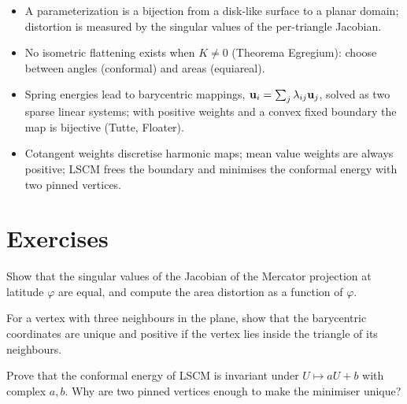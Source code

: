 \begin{keypoints}
\begin{itemize}[leftmargin=*]
  \item A parameterization is a bijection from a disk-like surface to a planar domain; distortion is
  measured by the singular values of the per-triangle Jacobian.
  \item No isometric flattening exists when $K\neq0$ (Theorema Egregium): choose between angles
  (conformal) and areas (equiareal).
  \item Spring energies lead to barycentric mappings, $\mathbf{u}_i=\sum_j\lambda_{ij}\mathbf{u}_j$, solved as two
  sparse linear systems; with positive weights and a convex fixed boundary the map is bijective
  (Tutte, Floater).
  \item Cotangent weights discretise harmonic maps; mean value weights are always positive; LSCM
  frees the boundary and minimises the conformal energy with two pinned vertices.
\end{itemize}
\end{keypoints}

\section*{Exercises}
\begin{exercise}
Show that the singular values of the Jacobian of the Mercator projection at latitude $\varphi$ are
equal, and compute the area distortion as a function of $\varphi$.
\end{exercise}
\begin{exercise}
For a vertex with three neighbours in the plane, show that the barycentric coordinates are unique
and positive if the vertex lies inside the triangle of its neighbours.
\end{exercise}
\begin{exercise}
Prove that the conformal energy of LSCM is invariant under $U\mapsto aU+b$ with complex $a,b$.
Why are two pinned vertices enough to make the minimiser unique?
\end{exercise}
